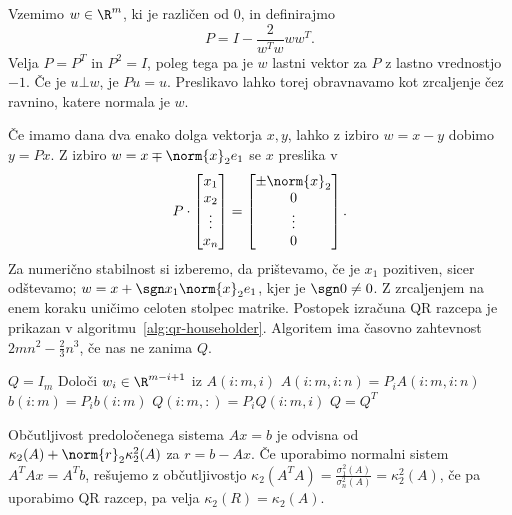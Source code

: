 

Vzemimo $w \in \R^m$, ki je različen od $0$, in definirajmo
\[
  P = I - \frac{2}{w^T w} w w^T.
\]
Velja $P = P^T$ in $P^2 = I$, poleg tega pa je $w$ lastni vektor za $P$ z lastno
vrednostjo $-1$.
Če je $u \bot w$, je $Pu = u$.
Preslikavo lahko torej obravnavamo kot zrcaljenje čez ravnino, katere normala je
$w$.

Če imamo dana dva enako dolga vektorja $x, y$, lahko z izbiro $w = x-y$ dobimo
$y = Px$.
Z izbiro $w = x \mp \norm{x}_2 e_1$ se $x$ preslika v
\[
  P
  \cdot
  \begin{bmatrix}
	x_1 \\ x_2 \\ \vdots \\ x_n
  \end{bmatrix}
  =
  \begin{bmatrix}
	\pm \norm{x}_2 \\ 0 \\ \vdots \\ 0
  \end{bmatrix}.
\]
Za numerično stabilnost si izberemo, da prištevamo, če je $x_1$ pozitiven, sicer
odštevamo; $w = x + \sgn x_1 \norm{x}_2 e_1$, kjer je $\sgn 0 \ne 0$.
Z zrcaljenjem na enem koraku uničimo celoten stolpec matrike.
Postopek izračuna QR razcepa je prikazan v algoritmu~\ref{alg:qr-householder}.
Algoritem ima časovno zahtevnost $2 mn^2 - \frac{2}{3} n^3$, če nas ne zanima
$Q$.

\begin{algorithm}
  \caption{QR razcep s Householderjevimi zrcaljenji}
  \label{alg:qr-householder}
  \begin{algorithmic}
	\State $Q = I_m$
	\State Določi $w_i \in \R^{m-i+1}$ iz $A(i:m, i)$
	\State $A(i:m, i:n) = P_i A(i:m, i:n)$
	\State $b(i:m) = P_i b(i:m)$
	\State $Q(i:m, :) = P_i Q(i:m, i)$
	\EndFor
	\State $Q = Q^T$
  \end{algorithmic}
\end{algorithm}


Občutljivost predoločenega sistema $Ax = b$ je odvisna od  $\kappa_2(A) +
\norm{r}_2 \kappa_2^2(A)$ za $r = b-Ax$.
Če uporabimo normalni sistem $A^T A x = A^T b$, rešujemo z občutljivostjo
$\kappa_2(A^T A) = \frac{\sigma_1^2(A)}{\sigma_n^2(A)} = \kappa_2^2(A)$, če pa
uporabimo QR razcep, pa velja $\kappa_2(R) = \kappa_2(A)$.


